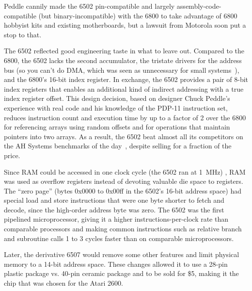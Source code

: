 \begin{geeknote}
  Peddle cannily made the 6502 pin-compatible and largely
  assembly-code-compatible (but 
  binary-incompatible) with the 6800 to take advantage of 
  6800 hobbyist kits and existing motherboards, but a lawsuit from
  Motorola soon put a stop to that.
\end{geeknote}




\begin{geeknote}
    The 6502 reflected good engineering taste in what to leave out.
    Compared to the 6800, the 6502 lacks the second accumulator, the
    tristate drivers for the address bus (so you can't do DMA, which was seen as
    unnecessary for small systems~\cite{byte75:6502}), 
    and the 6800's 16-bit index register.  In exchange, the 6502 provides a pair
    of 8-bit index registers that enables an additional kind of
    indirect addressing with a true index register offset.
    This design decision, based on designer Chuck Peddle's experience with real
    code and his knowledge of the PDP-11 instruction set, 
    reduces instruction count and execution time by up to a
    factor of 2 over the 6800 for referencing arrays using random
    offsets and for operations that
    maintain pointers into two arrays.
    As a result, the 6502
    beat almost all its competitors on  the AH Systems benchmarks of
    the day~\cite{edn75:6502}, despite selling for a fraction of the price.

    Since RAM could be accessed in one
    clock cycle (the 6502 ran at
    1~MHz) , RAM was used as overflow registers instead of devoting valuable die
    space to registers.  The ``zero
    page'' (bytes 0x0000 to 0x00ff in the 6502's 16-bit address space) had
    special load and store instructions that were one byte shorter to fetch and
    decode, since the high-order address byte was zero.
    The 6502 was the first pipelined
    microprocessor, giving it a higher instructions-per-clock 
    rate than comparable processors and making
    common instructions such as relative
    branch and subroutine calls 1 to 3 cycles faster than
    on comparable microprocessors.  

    Later, the derivative 6507 would
    remove some other features and limit
    physical memory to a 14-bit address space.  These changes allowed it to
    use a 28-pin 
    plastic package vs. 40-pin ceramic package and to be sold for \$5,
    making it the chip that was chosen for the Atari 2600.
\end{geeknote}

